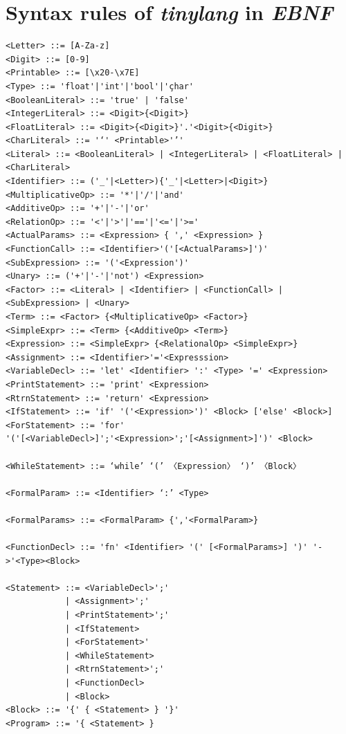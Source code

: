 \section{Syntax rules of \emph{tinylang} in \emph{EBNF}}
\label{sec:ebnf-tinylang-rules}
\begin{lstlisting}[caption = EBNF capturing the Syntax Rules of \emph{tinylang}.]
<Letter> ::= [A-Za-z]
<Digit> ::= [0-9]
<Printable> ::= [\x20-\x7E]
<Type> ::= 'float'|'int'|'bool'|'çhar'
<BooleanLiteral> ::= 'true' | 'false'
<IntegerLiteral> ::= <Digit>{<Digit>}
<FloatLiteral> ::= <Digit>{<Digit>}'.'<Digit>{<Digit>}
<CharLiteral> ::= '‘' <Printable>'’'
<Literal> ::= <BooleanLiteral> | <IntegerLiteral> | <FloatLiteral> | <CharLiteral>
<Identifier> ::= ('_'|<Letter>){'_'|<Letter>|<Digit>}
<MultiplicativeOp> ::= '*'|'/'|'and'
<AdditiveOp> ::= '+'|'-'|'or'
<RelationOp> ::= '<'|'>'|'=='|'<='|'>='
<ActualParams> ::= <Expression> { ',' <Expression> }
<FunctionCall> ::= <Identifier>'('[<ActualParams>]')'
<SubExpression> ::= '('<Expression')'
<Unary> ::= ('+'|'-'|'not') <Expression>
<Factor> ::= <Literal> | <Identifier> | <FunctionCall> | <SubExpression> | <Unary>
<Term> ::= <Factor> {<MultiplicativeOp> <Factor>}
<SimpleExpr> ::= <Term> {<AdditiveOp> <Term>}
<Expression> ::= <SimpleExpr> {<RelationalOp> <SimpleExpr>}
<Assignment> ::= <Identifier>'='<Expresssion>
<VariableDecl> ::= 'let' <Identifier> ':' <Type> '=' <Expression>
<PrintStatement> ::= 'print' <Expression>
<RtrnStatement> ::= 'return' <Expression>
<IfStatement> ::= 'if' '('<Expression>')' <Block> ['else' <Block>]
<ForStatement> ::= 'for' '('[<VariableDecl>]';'<Expression>';'[<Assignment>]')' <Block>

<WhileStatement> ::= ‘while’ ‘(’ 〈Expression〉 ‘)’ 〈Block〉

<FormalParam> ::= <Identifier> ‘:’ <Type>

<FormalParams> ::= <FormalParam> {','<FormalParam>}

<FunctionDecl> ::= 'fn' <Identifier> '(' [<FormalParams>] ')' '->'<Type><Block>

<Statement> ::= <VariableDecl>';' 
            | <Assignment>';'
            | <PrintStatement>';'
            | <IfStatement>
            | <ForStatement>'
            | <WhileStatement>
            | <RtrnStatement>';'
            | <FunctionDecl>
            | <Block>
<Block> ::= '{' { <Statement> } '}'        
<Program> ::= '{ <Statement> }         
            
\end{lstlisting}

